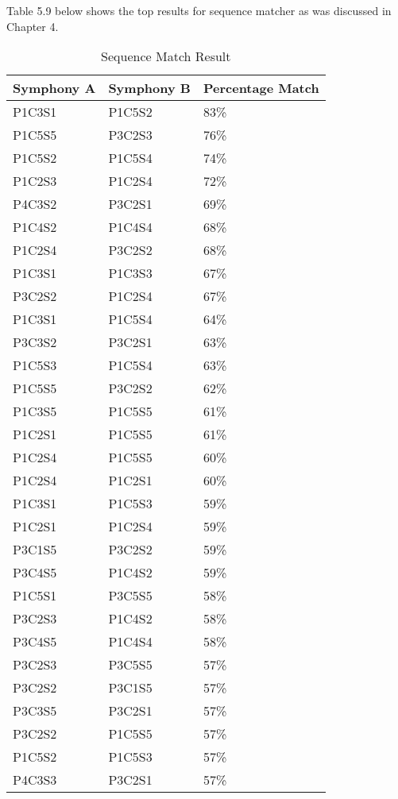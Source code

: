 Table 5.9 below shows the top results for sequence matcher as was discussed in Chapter 4.

\begin{longtable}{|l|l|l|}
\caption{Sequence Match Result}
\label{my-label}\\
\hline
Symphony A & Symphony B & Percentage Match \\ \hline
\endfirsthead
%
\endhead
%
P1C3S1 & P1C5S2 & 83\% \\ \hline
P1C5S5 & P3C2S3 & 76\% \\ \hline
P1C5S2 & P1C5S4 & 74\% \\ \hline
P1C2S3 & P1C2S4 & 72\% \\ \hline
P4C3S2 & P3C2S1 & 69\% \\ \hline
P1C4S2 & P1C4S4 & 68\% \\ \hline
P1C2S4 & P3C2S2 & 68\% \\ \hline
P1C3S1 & P1C3S3 & 67\% \\ \hline
P3C2S2 & P1C2S4 & 67\% \\ \hline
P1C3S1 & P1C5S4 & 64\% \\ \hline
P3C3S2 & P3C2S1 & 63\% \\ \hline
P1C5S3 & P1C5S4 & 63\% \\ \hline
P1C5S5 & P3C2S2 & 62\% \\ \hline
P1C3S5 & P1C5S5 & 61\% \\ \hline
P1C2S1 & P1C5S5 & 61\% \\ \hline
P1C2S4 & P1C5S5 & 60\% \\ \hline
P1C2S4 & P1C2S1 & 60\% \\ \hline
P1C3S1 & P1C5S3 & 59\% \\ \hline
P1C2S1 & P1C2S4 & 59\% \\ \hline
P3C1S5 & P3C2S2 & 59\% \\ \hline
P3C4S5 & P1C4S2 & 59\% \\ \hline
P1C5S1 & P3C5S5 & 58\% \\ \hline
P3C2S3 & P1C4S2 & 58\% \\ \hline
P3C4S5 & P1C4S4 & 58\% \\ \hline
P3C2S3 & P3C5S5 & 57\% \\ \hline
P3C2S2 & P3C1S5 & 57\% \\ \hline
P3C3S5 & P3C2S1 & 57\% \\ \hline
P3C2S2 & P1C5S5 & 57\% \\ \hline
P1C5S2 & P1C5S3 & 57\% \\ \hline
P4C3S3 & P3C2S1 & 57\% \\ \hline
\end{longtable}

